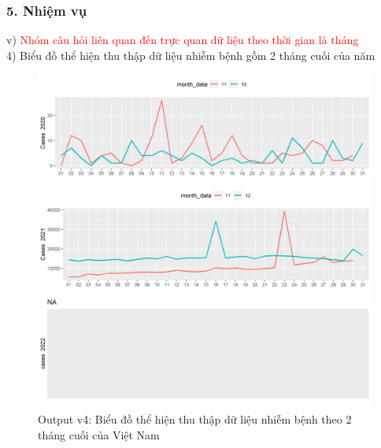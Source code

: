 \documentclass[english,10pt,table]{beamer}
\begin{document}
\begin{frame}[fragile]
\frametitle{5.  Nhiệm vụ}
v) \textcolor{red}{Nhóm câu hỏi liên quan đến trực quan dữ liệu theo thời gian là tháng}\\
    4) Biểu đồ thể hiện thu thập dữ liệu nhiễm bệnh gồm 2 tháng cuối của năm
	\begin{figure}[h!]
	\begin{center}
		    \includegraphics[scale = 0.25]{Images/V/v4 Vietnam .jpeg}
		     \caption{Output v4: Biểu đồ thể hiện thu thập dữ liệu nhiễm bệnh theo 2 tháng cuối của Việt Nam}
		\end{center}
		\end{figure}
\end{frame}
\end{document}
